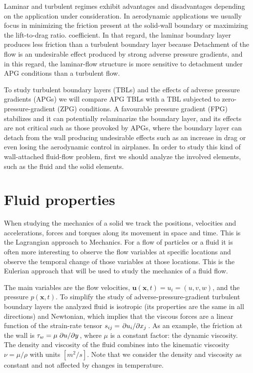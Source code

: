 Laminar and turbulent regimes exhibit advantages and disadvantages depending on the application under consideration. 
In aerodynamic applications we usually focus in minimizing the friction present at the solid-wall boundary or maximizing the lift-to-drag ratio. coefficient. In that regard, the laminar boundary layer produces less friction than a turbulent boundary layer because 
Detachment of the flow is an undesirable effect produced by strong adverse pressure gradients, and in this regard, the laminar-flow structure is more sensitive to detachment under APG conditions than a turbulent flow.

To study turbulent boundary layers (TBLs) and the effects of adverse pressure gradients (APGs) we will compare APG TBLs with a TBL subjected to zero-pressure-gradient (ZPG) conditions. A favourable pressure gradient (FPG) stabilizes and it can potentially relaminarize the boundary layer, and its effects are not critical such as those provoked by APGs, where the boundary layer can detach from the wall producing undesirable effects such as an increase in drag or even losing the aerodynamic control in airplanes.
In order to study this kind of wall-attached fluid-flow problem, first we should analyze the involved elements, such as the fluid and the solid elements.

\section{Fluid properties}

When studying the mechanics of a solid we track the positions, velocities and accelerations, forces and torques along its movement in space and time. This is the Lagrangian approach to Mechanics.
For a flow of particles or a fluid it is often more interesting to observe the flow variables at specific locations and observe the temporal change of those variables at those locations. This is the Eulerian approach that will be used to study the mechanics of a fluid flow. 

The main variables are the flow velocities, $\pmb{u}(\pmb{x},t)=u_i=(u,v,w)$, and the pressure $p(\pmb{x},t)$.
To simplify the study of adverse-pressure-gradient turbulent boundary layers the analyzed fluid is isotropic (its properties are the same in all directions) and Newtonian, which implies that the viscous forces are a linear function of the strain-rate tensor $s_{ij}=\pdv{u_i}/{x_j}$. As an example, the friction at the wall is $\tau_w=\mu \pdv{u}/{y}$,
where $\mu$ is a constant factor: the dynamic viscosity.
The density and viscosity of the fluid combines into the kinematic viscosity $\nu=\mu/\rho$ with units $[m^2/s]$. 
Note that we consider the density and viscosity as constant and not affected by changes in temperature.

